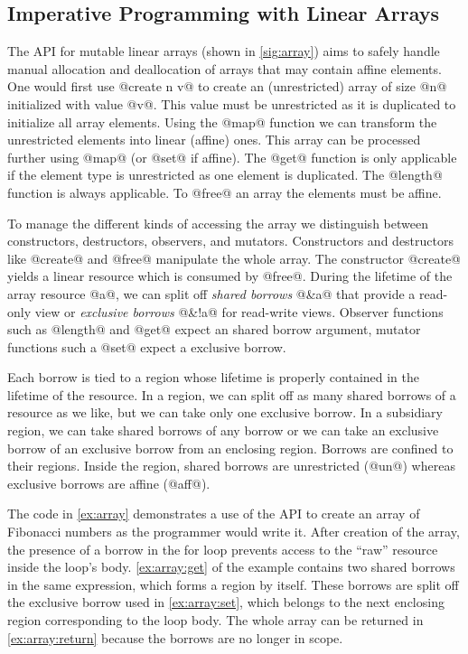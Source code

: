 
\subsection{Imperative Programming with Linear Arrays}
\label{sec:imper-progr}

The API for mutable linear arrays (shown in \cref{sig:array})
aims to safely handle manual allocation and
deallocation of arrays that may contain affine elements.
One would first use @create n v@ to create
an (unrestricted) array of size @n@ initialized with value
@v@. This value must be unrestricted as it is duplicated to
initialize all array elements. Using the @map@ function we
can transform the unrestricted elements into linear (affine)
ones. This array can be processed further using @map@ (or @set@ if
affine). The @get@ function is only applicable if the element type
is unrestricted as one element is duplicated. The @length@
function is always applicable. To @free@ an array the elements must be
affine.

To manage the different kinds of accessing the array we distinguish between constructors, destructors,
observers, and mutators.
Constructors and destructors like @create@ and @free@ manipulate the whole
array. %
The constructor
@create@ yields a linear resource which is consumed by @free@.
During the lifetime of the array resource @a@, we can split
off \emph{shared borrows} @&a@ that provide a read-only
view or \emph{exclusive borrows} @&!a@ for read-write views.
Observer functions such as @length@ and @get@ expect an shared borrow
argument, mutator functions such a @set@ expect
a exclusive borrow.

Each borrow is tied to a region whose lifetime is properly
contained in the lifetime of the resource.
In a region, we can split off as many shared borrows of a resource as
we like, but we can take only one exclusive borrow. In a 
subsidiary region, we can take shared borrows of any
borrow or we can take an exclusive borrow of an exclusive borrow from an
enclosing region. Borrows are confined to their regions. Inside the region,
shared borrows are unrestricted (@un@) whereas exclusive
borrows are affine (@aff@).

The code in \cref{ex:array} demonstrates a use of the API to create an
array of Fibonacci numbers as the programmer would write it. After
creation of the array, the presence of a borrow in the for loop
prevents access to the ``raw'' resource inside the loop's
body. \cref{ex:array:get} of the example contains two shared borrows
in the same expression, which forms a region by itself. These borrows
are split off the exclusive borrow used in \cref{ex:array:set}, which
belongs to the next enclosing region corresponding to the loop body.
The whole array can be returned in \cref{ex:array:return} because  the
borrows are no longer in scope. 

